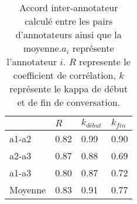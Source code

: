 \begin{table}[th]
    \centering
    \begin{tabular}{| p{2cm} | l | l l |}
    \hline
      & $R$ & $k_{début}$ &$k_{fin}$  \\
      \hline
      a1-a2   &0.82   &0.99   &0.90   \\
      a2-a3   &0.87   &0.88   &0.69   \\
      a1-a3   &0.80   &0.87   &0.72   \\
      \hline
      Moyenne &0.83   &0.91   &0.77   \\
      \hline
    \end{tabular}
    \caption{Accord inter-annotateur calculé entre les pairs d'annotateurs ainsi que la moyenne.$a_i$ représente l'annotateur $i$. $R$ represente le coefficient de corrélation, $k$ représente le kappa de début et de fin de conversation.}
    \label{tab:accordInterAnnot}
  \end{table}
